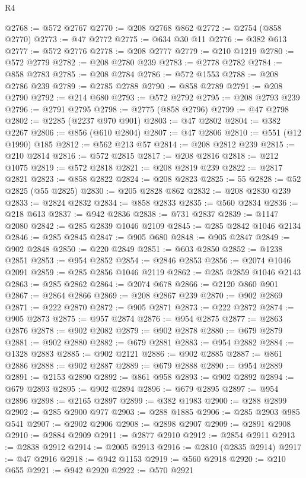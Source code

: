 \begin{lexlean}{R4}
\begin{coremodule}
@2768 := @572 @2767
@2770 := @208 @2768 @862
@2772 := @2754 (@858 @2770)
@2773 := @47 @2772
@2775 := @634 @30 @11
@2776 := @382 @613
@2777 := @572 @2776
@2778 := @208 @2777
@2779 := @210 @1219
@2780 := @572 @2779
@2782 := @208 @2780 @239
@2783 := @2778 @2782
@2784 := @858 @2783
@2785 := @208 @2784
@2786 := @572 @1553
@2788 := @208 @2786 @239
@2789 := @2785 @2788
@2790 := @858 @2789
@2791 := @208 @2790
@2792 := @214 @680
@2793 := @572 @2792
@2795 := @208 @2793 @239
@2796 := @2791 @2795
@2798 := @2775 (@858 @2796)
@2799 := @47 @2798
@2802 := @2285 (@2237 @970 @901)
@2803 := @47 @2802
@2804 := @382 @2267
@2806 := @856 (@610 @2804)
@2807 := @47 @2806
@2810 := @551 (@12 @1990) @185
@2812 := @562 @213 @57
@2814 := @208 @2812 @239
@2815 := @210 @2814
@2816 := @572 @2815
@2817 := @208 @2816
@2818 := @212 @1075
@2819 := @572 @2818
@2821 := @208 @2819 @239
@2822 := @2817 @2821
@2823 := @858 @2822
@2824 := @208 @2823
@2825 := 55
@2828 := @52 @2825 (@55 @2825)
@2830 := @205 @2828 @862
@2832 := @208 @2830 @239
@2833 := @2824 @2832
@2834 := @858 @2833
@2835 := @560 @2834
@2836 := @218 @613
@2837 := @942 @2836
@2838 := @731 @2837
@2839 := @1147 @2080
@2842 := @285 @2839 @1046 @2109
@2845 := @285 @2842 @1046 @2134
@2846 := @285 @2845
@2847 := @905 @680
@2848 := @905 @2847
@2849 := @902 @2848
@2850 := @220 @2849
@2851 := @603 @2850
@2852 := @1238 @2851
@2853 := @954 @2852
@2854 := @2846 @2853
@2856 := @2074 @1046 @2091
@2859 := @285 @2856 @1046 @2119
@2862 := @285 @2859 @1046 @2143
@2863 := @285 @2862
@2864 := @2074 @678
@2866 := @2120 @860 @901
@2867 := @2864 @2866
@2869 := @208 @2867 @239
@2870 := @902 @2869
@2871 := @222 @2870
@2872 := @905 @2871
@2873 := @222 @2872
@2874 := @905 @2873
@2875 := @957 @2874
@2876 := @954 @2875
@2877 := @2863 @2876
@2878 := @902 @2082
@2879 := @902 @2878
@2880 := @679 @2879
@2881 := @902 @2880
@2882 := @679 @2881
@2883 := @954 @2882
@2884 := @1328 @2883
@2885 := @902 @2121
@2886 := @902 @2885
@2887 := @861 @2886
@2888 := @902 @2887
@2889 := @679 @2888
@2890 := @954 @2889
@2891 := @2153 @2890
@2892 := @861 @958
@2893 := @902 @2892
@2894 := @679 @2893
@2895 := @902 @2894
@2896 := @679 @2895
@2897 := @954 @2896
@2898 := @2165 @2897
@2899 := @382 @1983
@2900 := @288 @2899
@2902 := @285 @2900 @977
@2903 := @288 @1885
@2906 := @285 @2903 @985 @541
@2907 := @2902 @2906
@2908 := @2898 @2907
@2909 := @2891 @2908
@2910 := @2884 @2909
@2911 := @2877 @2910
@2912 := @2854 @2911
@2913 := @2838 @2912
@2914 := @2005 @2913
@2916 := @2810 (@2835 @2914)
@2917 := @47 @2916
@2918 := @942 @1153
@2919 := @560 @2918
@2920 := @210 @655
@2921 := @942 @2920
@2922 := @570 @2921

\end{coremodule}
\end{lexlean}
